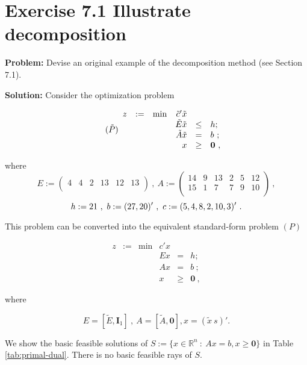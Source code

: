 \section{Exercise 7.1 Illustrate decomposition}
\textbf{Problem:} Devise an original example of the decomposition method (see Section 7.1).

\textbf{Solution:} Consider the optimization problem

\[
\tag{$\tilde{P}$}
\begin{array}{ccrrcl}
z & := & \min & \tilde{c}'\tilde{x}  &      &   \\
   &&   &  \tilde{E}\tilde{x}  &\leq & h; \\
   &&   &  \tilde{A}\tilde{x}  &   =  & b~; \\
   &&   &   x  & \geq & \mathbf{0}~,
\end{array}
\]

where
\[
E  :=  \left(
  \begin{array}{cccccc}
   4  &   4  &   2  &  13  &  12  &  13 \\
  \end{array}
\right)~,~
A  :=  \left(
  \begin{array}{cccccc}
      14   &  9  &  13  &   2  &   5  &  12 \\
    15   &  1  &   7  &   7   &  9  &  10 \\
  \end{array}
\right)~,
\]
\[
h  :=  21~,~
b  :=  (27,20)'~,~
c  :=  (5, 4, 8, 2, 10, 3)'~.\\
\]

This problem can be converted into the equivalent standard-form problem $(P)$ 

\[
\tag{$P$}
\begin{array}{ccrrcl}
z & := & \min & c'x  &      &   \\
   &&   &  Ex  & = & h; \\
   &&   &  Ax  &   =  & b~; \\
   &&   &   x  & \geq & \mathbf{0}~,
\end{array}
\]

where

$$ E = [\tilde{E}, \mathbf{I}_1]~,~ A = [\tilde{A}, \mathbf{0}], x = (\tilde{x}~s)'. $$

We show the basic feasible solutions of $S := \{x\in \mathbb{R}^n~:~Ax=b,x\geq\mathbf{0}\}$ in Table \ref{tab:primal-dual}. There is no basic feasible rays of $S$.

